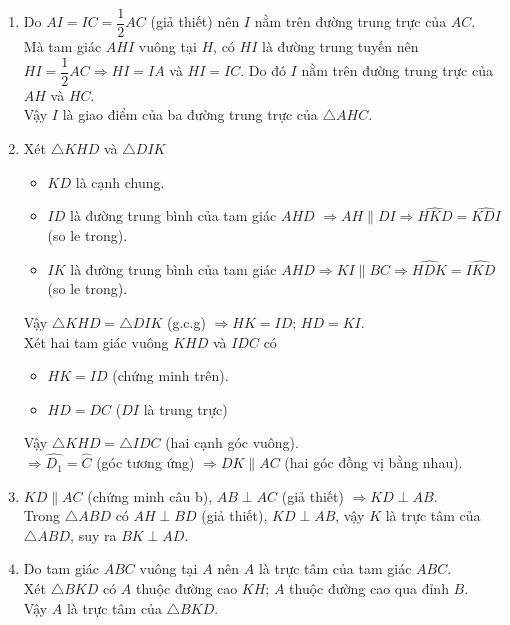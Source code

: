 \begin{vd}
{\begin{center}
\end{center}
\begin{enumerate}
	\item Do $AI=IC=\dfrac{1}{2}AC$ (giả thiết) nên $I$ nằm trên đường trung trực của $AC$.\\
	 Mà tam giác $AHI$ vuông tại $H$, có $HI$ là đường trung tuyến nên $HI=\dfrac{1}{2}AC\Rightarrow HI=IA$ và $HI=IC$. Do đó $I$ nằm trên đường trung trực của $AH$ và $HC$.\\
	Vậy $I$ là giao điểm của ba đường trung trực của $\triangle AHC$.
	\item  Xét $\triangle KHD$ và $\triangle DIK$
	 \begin{itemize}
		\item $KD$ là cạnh chung. 
		\item $ID$ là đường trung bình của tam giác $AHD$ $\Rightarrow AH\parallel DI\Rightarrow \widehat{HKD}=\widehat{KDI}$ (so le trong).
	\item $IK$ là đường trung bình của tam giác $AHD$$\Rightarrow KI\parallel BC\Rightarrow \widehat{HDK}=\widehat{IKD}$ (so le trong).
	\end{itemize}
	Vậy $\triangle KHD=\triangle DIK$ (g.c.g) $\Rightarrow HK=ID$; $HD=KI$.\\
	Xét hai tam giác vuông $KHD$ và $IDC$ có
	\begin{itemize}
		\item $HK=ID$ (chứng minh trên).
		\item $HD=DC$ ($DI$ là trung trực)
	\end{itemize}
Vậy $\triangle KHD=\triangle IDC$ (hai cạnh góc vuông).
\\ $\Rightarrow \widehat{D_1}=\widehat{C}$ (góc tương ứng) $\Rightarrow DK\parallel AC$ (hai góc đồng vị bằng nhau).
\item $KD\parallel AC$ (chứng minh câu b), $AB\perp AC$ (giả thiết) $\Rightarrow KD\perp AB$.\\
Trong $\triangle ABD$ có $AH\perp BD$ (giả thiết), $KD\perp AB$, vậy $K$ là trực tâm của $\triangle ABD$, suy  ra $BK\perp AD$.
\item Do tam giác $ABC$ vuông tại $A$ nên $A$ là trực tâm của tam giác $ABC$.\\
Xét $\triangle BKD$ có $A$ thuộc đường cao $KH$; $A$ thuộc đường cao qua đỉnh $B$.\\
Vậy $A$ là trực tâm của $\triangle BKD$.
\end{enumerate}}

\end{vd}
